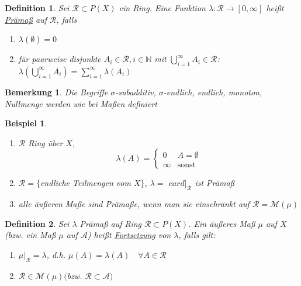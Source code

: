 \documentclass[11pt]{memoir}
\theoremstyle{changebreak}
\newtheorem{Definition}{Definition}[chapter]
\newtheorem{Bemerkung}{Bemerkung}[chapter]
\newtheorem{Beispiel}{Beispiel}[chapter]
\begin{document}
\begin{Definition}
Sei $\mathscr R \subset P(X)$ ein Ring. Eine Funktion $\lambda: \mathscr R \rightarrow [0, \infty]$ heißt \underline{Prämaß} auf $\mathscr R$, falls
\begin{enumerate}
	\item $\lambda(\emptyset) = 0$
	\item für paarweise disjunkte $A_i \in \mathscr R, i \in \mathbb N$ mit $\bigcup\limits_{i=1}^\infty A_i \in \mathscr R$: \\
	$\lambda \left(\bigcup\limits_{i=1}^\infty A_i\right) = \sum\limits_{i=1}^\infty \lambda(A_i)$
\end{enumerate}
\end{Definition}

\begin{Bemerkung}
Die Begriffe $\sigma$-subadditiv, $\sigma$-endlich, endlich, monoton, Nullmenge werden wie bei Maßen definiert
\end{Bemerkung}

\begin{Beispiel}
\begin{enumerate}
	\item $\mathscr R$ Ring über $X$,
	\begin{equation}
	\lambda(A) =
		\begin{cases}
			0 & A = \emptyset \\
			\infty & \text{sonst}
		\end{cases}
	\end{equation}
	\item $\mathscr R = \{$endliche Teilmengen vom $X\}$, $\lambda = $ $card|_{\mathscr R}$ ist Prämaß
	\item alle äußeren Maße sind Prämaße, wenn man sie einschränkt auf $\mathscr R = \mathscr M(\mu)$
\end{enumerate}
\end{Beispiel}

\begin{Definition}
Sei $\lambda$ Prämaß auf Ring $\mathscr R \subset P(X)$. Ein äußeres Maß $\mu$ auf $X$ (bzw. ein Maß $\mu$ auf $\mathscr A$) heißt \underline{Fortsetzung} von $\lambda$, falls gilt:
\begin{enumerate}
	\item $\mu|_\mathscr R = \lambda$, d.h. $\mu(A) = \lambda(A)\quad \forall A \in \mathscr R$
	\item $\mathscr R \in \mathscr M(\mu) ($bzw. $\mathscr R \subset \mathscr A)$
\end{enumerate}
\end{Definition}
\end{document}
